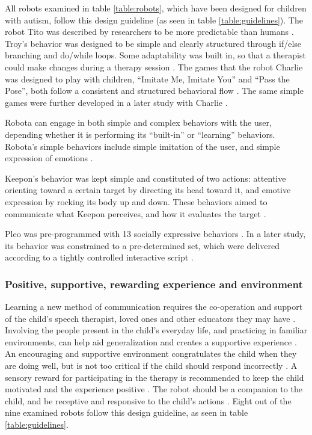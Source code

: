 All robots examined in table \ref{table:robots}, which have been designed for children with autism, follow this design guideline (as seen in table \ref{table:guidelines}). The robot Tito was described by researchers to be more predictable than humans \cite{duquette2008exploring}. Troy's behavior was designed to be simple and clearly structured through if/else branching and do/while loops. Some adaptability was built in, so that a therapist could make changes during a therapy session \cite{giullian2010detailed}. The games that the robot Charlie was designed to play with children, ``Imitate Me, Imitate You'' and ``Pass the Pose'', both follow a consistent and structured behavioral flow \cite{charlie2011}. The same simple games were further developed in a later study with Charlie \cite{boccanfuso2017low}.

Robota can engage in both simple and complex behaviors with the user, depending whether it is performing its ``built-in'' or ``learning'' behaviors. Robota's simple behaviors include simple imitation of the user, and simple expression of emotions \cite{billard2006building}.

Keepon's behavior was kept simple and constituted of two actions: attentive orienting toward a certain target by directing its head toward it, and emotive expression by rocking its body up and down. These behaviors aimed to communicate what Keepon perceives, and how it evaluates the target \cite{kozima2009keepon}.

Pleo was pre-programmed with 13 socially expressive behaviors \cite{kim2013social}. In a later study, its behavior was constrained to a pre-determined set, which were delivered according to a tightly controlled interactive script \cite{kim2015potential}.



\subsubsection{Positive, supportive, rewarding experience and environment}

Learning a new method of communication requires the co-operation and support of the child's speech therapist, loved ones and other educators they may have \cite{tetzchner}. Involving the people present in the child's everyday life, and practicing in familiar environments, can help aid generalization and creates a supportive experience \cite{carr1983acquisition}. An encouraging and supportive environment congratulates the child when they are doing well, but is not too critical if the child should respond incorrectly \cite{michaud2003characteristics, robins2007eliciting}. A sensory reward for participating in the therapy is recommended to keep the child motivated and the experience positive \cite{ michaud2003characteristics, robins2007eliciting}. The robot should be a companion to the child, and be receptive and responsive to the child's actions \cite{robins2007eliciting}. Eight out of the nine examined robots follow this design guideline, as seen in table \ref{table:guidelines}.

